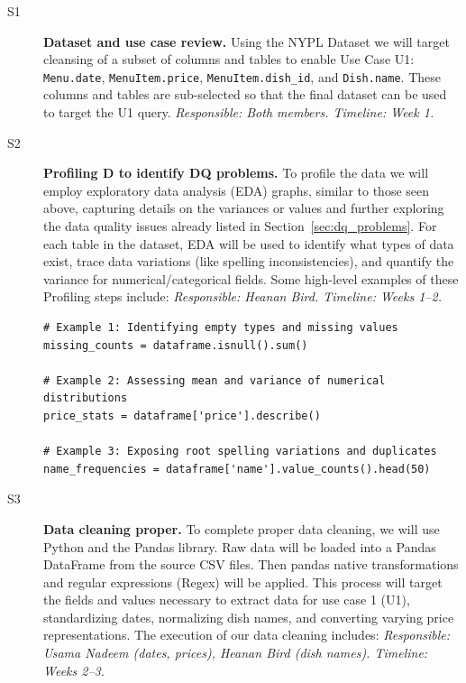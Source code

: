 \documentclass[11pt]{article}
\begin{document}
\begin{description}
    \item[S1] \textbf{Dataset and use case review.} Using the NYPL Dataset we will
    target cleansing of a subset of columns and tables to enable Use Case U1:
    \texttt{Menu.date}, \texttt{MenuItem.price}, \texttt{MenuItem.dish\_id}, and
    \texttt{Dish.name}. These columns and tables are sub-selected so that the final
    dataset can be used to target the U1 query.
    \textit{Responsible: Both members. Timeline: Week 1.}
    
    \item[S2] \textbf{Profiling D to identify DQ problems.} To profile the data we
    will employ exploratory data analysis (EDA) graphs, similar to those seen above,
    capturing details on the variances or values and further exploring the data
    quality issues already listed in Section~\ref{sec:dq_problems}. For each table
    in the dataset, EDA will be used to identify what types of data exist, trace
    data variations (like spelling inconsistencies), and quantify the variance for
    numerical/categorical fields. Some high-level examples of these Profiling steps
    include:
    \textit{Responsible: Heanan Bird. Timeline: Weeks 1--2.}
    
\begin{verbatim}
# Example 1: Identifying empty types and missing values
missing_counts = dataframe.isnull().sum()

# Example 2: Assessing mean and variance of numerical distributions
price_stats = dataframe['price'].describe()

# Example 3: Exposing root spelling variations and duplicates
name_frequencies = dataframe['name'].value_counts().head(50)
\end{verbatim}
    
    \item[S3] \textbf{Data cleaning proper.} To complete proper data cleaning, we
    will use Python and the Pandas library. Raw data will be loaded into a Pandas
    DataFrame from the source CSV files. Then pandas native transformations and
    regular expressions (Regex) will be applied. This process will target the fields
    and values necessary to extract data for use case 1 (U1), standardizing dates,
    normalizing dish names, and converting varying price representations. The
    execution of our data cleaning includes:
    \textit{Responsible: Usama Nadeem (dates, prices), Heanan Bird (dish names). Timeline: Weeks 2--3.}


\end{description}
\end{document}
